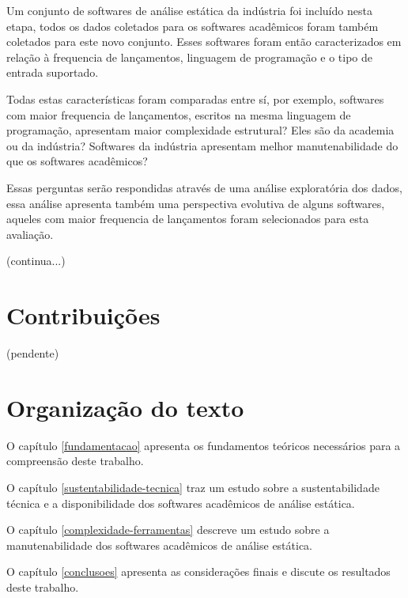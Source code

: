 Um conjunto de softwares de análise estática da indústria foi incluído nesta
etapa, todos os dados coletados para os softwares acadêmicos foram também
coletados para este novo conjunto. Esses softwares foram então caracterizados em
relação à frequencia de lançamentos, linguagem de programação e o tipo de
entrada suportado.

Todas estas características foram comparadas entre sí, por exemplo, softwares
com maior frequencia de lançamentos, escritos na mesma linguagem de
programação, apresentam maior complexidade estrutural? Eles são da academia ou
da indústria? Softwares da indústria apresentam melhor manutenabilidade do que
os softwares acadêmicos?

Essas perguntas serão respondidas através de uma análise exploratória dos
dados, essa análise apresenta também uma perspectiva evolutiva de alguns
softwares, aqueles com maior frequencia de lançamentos foram selecionados para
esta avaliação.

(continua...)

\section{Contribuições}

(pendente)

\section{Organização do texto}

O capítulo \ref{fundamentacao} apresenta os fundamentos teóricos necessários
para a compreensão deste trabalho.

O capítulo \ref{sustentabilidade-tecnica} traz um estudo sobre a
sustentabilidade técnica e a disponibilidade dos softwares acadêmicos de
análise estática.

O capítulo \ref{complexidade-ferramentas} descreve um estudo sobre a
manutenabilidade dos softwares acadêmicos de análise estática.

O capítulo \ref{conclusoes} apresenta as considerações finais e discute os
resultados deste trabalho.
